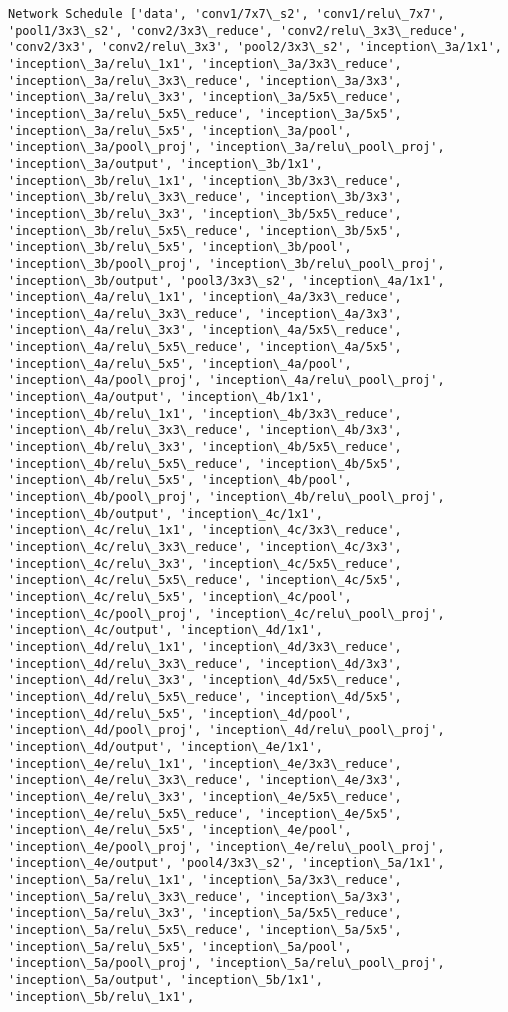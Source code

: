 \documentclass[11pt]{article}
\begin{document}
\begin{Verbatim}[commandchars=\\\{\}]
Network Schedule ['data', 'conv1/7x7\_s2', 'conv1/relu\_7x7', 'pool1/3x3\_s2', 'conv2/3x3\_reduce', 'conv2/relu\_3x3\_reduce', 'conv2/3x3', 'conv2/relu\_3x3', 'pool2/3x3\_s2', 'inception\_3a/1x1', 'inception\_3a/relu\_1x1', 'inception\_3a/3x3\_reduce', 'inception\_3a/relu\_3x3\_reduce', 'inception\_3a/3x3', 'inception\_3a/relu\_3x3', 'inception\_3a/5x5\_reduce', 'inception\_3a/relu\_5x5\_reduce', 'inception\_3a/5x5', 'inception\_3a/relu\_5x5', 'inception\_3a/pool', 'inception\_3a/pool\_proj', 'inception\_3a/relu\_pool\_proj', 'inception\_3a/output', 'inception\_3b/1x1', 'inception\_3b/relu\_1x1', 'inception\_3b/3x3\_reduce', 'inception\_3b/relu\_3x3\_reduce', 'inception\_3b/3x3', 'inception\_3b/relu\_3x3', 'inception\_3b/5x5\_reduce', 'inception\_3b/relu\_5x5\_reduce', 'inception\_3b/5x5', 'inception\_3b/relu\_5x5', 'inception\_3b/pool', 'inception\_3b/pool\_proj', 'inception\_3b/relu\_pool\_proj', 'inception\_3b/output', 'pool3/3x3\_s2', 'inception\_4a/1x1', 'inception\_4a/relu\_1x1', 'inception\_4a/3x3\_reduce', 'inception\_4a/relu\_3x3\_reduce', 'inception\_4a/3x3', 'inception\_4a/relu\_3x3', 'inception\_4a/5x5\_reduce', 'inception\_4a/relu\_5x5\_reduce', 'inception\_4a/5x5', 'inception\_4a/relu\_5x5', 'inception\_4a/pool', 'inception\_4a/pool\_proj', 'inception\_4a/relu\_pool\_proj', 'inception\_4a/output', 'inception\_4b/1x1', 'inception\_4b/relu\_1x1', 'inception\_4b/3x3\_reduce', 'inception\_4b/relu\_3x3\_reduce', 'inception\_4b/3x3', 'inception\_4b/relu\_3x3', 'inception\_4b/5x5\_reduce', 'inception\_4b/relu\_5x5\_reduce', 'inception\_4b/5x5', 'inception\_4b/relu\_5x5', 'inception\_4b/pool', 'inception\_4b/pool\_proj', 'inception\_4b/relu\_pool\_proj', 'inception\_4b/output', 'inception\_4c/1x1', 'inception\_4c/relu\_1x1', 'inception\_4c/3x3\_reduce', 'inception\_4c/relu\_3x3\_reduce', 'inception\_4c/3x3', 'inception\_4c/relu\_3x3', 'inception\_4c/5x5\_reduce', 'inception\_4c/relu\_5x5\_reduce', 'inception\_4c/5x5', 'inception\_4c/relu\_5x5', 'inception\_4c/pool', 'inception\_4c/pool\_proj', 'inception\_4c/relu\_pool\_proj', 'inception\_4c/output', 'inception\_4d/1x1', 'inception\_4d/relu\_1x1', 'inception\_4d/3x3\_reduce', 'inception\_4d/relu\_3x3\_reduce', 'inception\_4d/3x3', 'inception\_4d/relu\_3x3', 'inception\_4d/5x5\_reduce', 'inception\_4d/relu\_5x5\_reduce', 'inception\_4d/5x5', 'inception\_4d/relu\_5x5', 'inception\_4d/pool', 'inception\_4d/pool\_proj', 'inception\_4d/relu\_pool\_proj', 'inception\_4d/output', 'inception\_4e/1x1', 'inception\_4e/relu\_1x1', 'inception\_4e/3x3\_reduce', 'inception\_4e/relu\_3x3\_reduce', 'inception\_4e/3x3', 'inception\_4e/relu\_3x3', 'inception\_4e/5x5\_reduce', 'inception\_4e/relu\_5x5\_reduce', 'inception\_4e/5x5', 'inception\_4e/relu\_5x5', 'inception\_4e/pool', 'inception\_4e/pool\_proj', 'inception\_4e/relu\_pool\_proj', 'inception\_4e/output', 'pool4/3x3\_s2', 'inception\_5a/1x1', 'inception\_5a/relu\_1x1', 'inception\_5a/3x3\_reduce', 'inception\_5a/relu\_3x3\_reduce', 'inception\_5a/3x3', 'inception\_5a/relu\_3x3', 'inception\_5a/5x5\_reduce', 'inception\_5a/relu\_5x5\_reduce', 'inception\_5a/5x5', 'inception\_5a/relu\_5x5', 'inception\_5a/pool', 'inception\_5a/pool\_proj', 'inception\_5a/relu\_pool\_proj', 'inception\_5a/output', 'inception\_5b/1x1', 'inception\_5b/relu\_1x1', 
\end{Verbatim}
\end{document}
